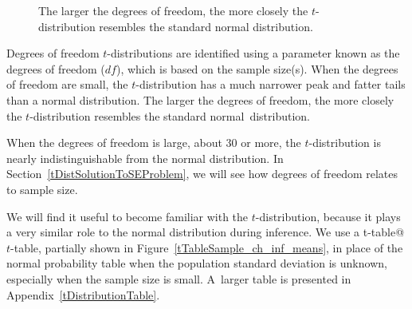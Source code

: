 \begin{figure}[h]
\centering
\caption{The larger the degrees of freedom, the more closely the $t$-distribution resembles the standard normal distribution.}
\label{tDistConvergeToNormalDist}
\end{figure}

\begin{onebox}{Degrees of freedom}
$t$-distributions are identified using a
parameter known as the degrees of freedom ($df$), which is based on
the sample size(s).  When the degrees of freedom are small, the $t$-distribution
has a much narrower peak and fatter tails than a normal distribution. The larger the degrees of freedom, the more closely the $t$-distribution resembles the standard normal~distribution.\end{onebox}



When the degrees of freedom is large, about 30 or more, the $t$-distribution is nearly indistinguishable from the normal distribution. In Section~\ref{tDistSolutionToSEProblem}, we will see how degrees of freedom relates to sample size.

We will find it useful to become familiar with the $t$-distribution, because it plays a very similar role to the normal distribution during inference.  We use a 
    {t-table@$t$-table}, partially shown in Figure~\ref{tTableSample_ch_inf_means}, in place of the normal probability table when the population standard deviation is unknown, especially when the sample size is small. A~larger table is presented in Appendix~\ref{tDistributionTable}.

